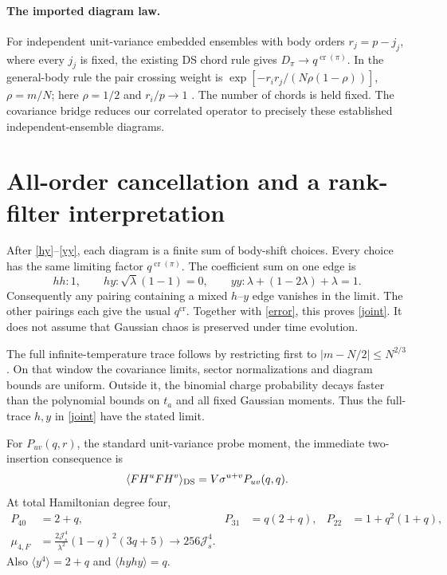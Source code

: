 \documentclass[11pt,a4paper]{article}
\newcommand{\Js}{\mathcal J_s}
\newcommand{\av}[1]{\langle #1\rangle}
\begin{document}
\paragraph{The imported diagram law.}
For independent unit-variance embedded ensembles with body orders
$r_j=p-j_j$, where every $j_j$ is fixed, the existing DS chord
rule gives $D_\pi\to q^{\operatorname{cr}(\pi)}$.
In the general-body rule the pair crossing weight is
$\exp[-r_ir_j/(N\rho(1-\rho))]$, $\rho=m/N$; here
$\rho=1/2$ and $r_i/p\to1$ \cite{tall,bnr}.
The number of chords is held fixed. The covariance bridge
reduces our correlated operator to precisely these established
independent-ensemble diagrams.

\newpage
\section{All-order cancellation and a rank-filter interpretation}
After \eqref{hy}--\eqref{yy}, each diagram is a finite sum of
body-shift choices. Every choice has the same limiting
factor $q^{\operatorname{cr}(\pi)}$. The coefficient sum on one
edge is
\begin{equation}
 hh:1,\qquad hy:\sqrt\lambda(1-1)=0,\qquad
 yy:\lambda+(1-2\lambda)+\lambda=1.             \label{sums}
\end{equation}
Consequently any pairing containing a mixed $h$--$y$ edge
vanishes in the limit. The other pairings each give the usual
$q^{\operatorname{cr}}$. Together with \eqref{error}, this proves
\eqref{joint}. It does not assume that Gaussian chaos is preserved
under time evolution.

The full infinite-temperature trace follows by restricting first
to $|m-N/2|\leq N^{2/3}$. On that window the covariance limits,
sector normalizations and diagram bounds are uniform. Outside it,
the binomial charge probability decays faster than the polynomial
bounds on $t_a$ and all fixed Gaussian moments. Thus the
full-trace $h,y$ in \eqref{joint} have the stated limit.

For $P_{uv}(q,r)$, the standard unit-variance probe moment,
the immediate two-insertion consequence is
\begin{equation}
 \av{FH^uFH^v}_{\rm DS}=V\sigma^{u+v}P_{uv}(q,q).
                                                               \label{twoarc}
\end{equation}
At total Hamiltonian degree four,
\begin{align}
 P_{40}&=2+q,&P_{31}&=q(2+q),&P_{22}&=1+q^2(1+q),\\
 \mu_{4,F}&=\frac{2\Js^4}{\lambda^2}(1-q)^2(3q+5)
                 \longrightarrow256\Js^4.                    \label{fourth}
\end{align}
Also $\av{y^4}=2+q$ and $\av{hyhy}=q$.
\end{document}
